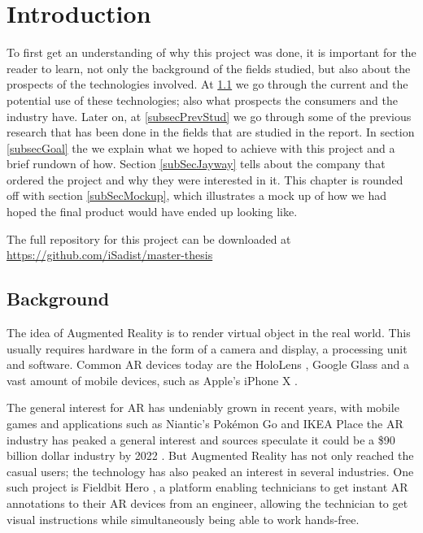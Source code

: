 \chapter{Introduction}
To first get an understanding of why this project was done, it is important for the reader to learn, not only the background of the fields studied, but also about the prospects of the technologies involved.
 At \ref{subsecBackground} we go through the current and the potential use of these technologies; also what prospects the consumers and the industry have. Later on, at  \ref{subsecPrevStud} we go through some of the previous research that has been done in the fields that are studied in the report. In section \ref{subsecGoal} the we explain what we hoped to achieve with this project and a brief rundown of how. Section \ref{subSecJayway} tells about the company that ordered the project and why they were interested in it. This chapter is rounded off with section \ref{subSecMockup}, which illustrates a mock up of how we had hoped the final product would have ended up looking like.
 
 The full repository for this project can be downloaded at \url{https://github.com/iSadist/master-thesis}

\section{Background}
\label{subsecBackground}
The idea of Augmented Reality is to render virtual object in the real world. This usually 
requires hardware in the form of a camera and display, a processing unit and software. 
Common AR devices today are the HoloLens \cite{microsoft}, Google Glass 
\cite{googleGlasses} and a vast amount of mobile devices, such as Apple's iPhone X 
\cite{appleAR}. 

The general interest for AR has undeniably grown in recent years, with mobile games and 
applications such as Niantic's Pokémon Go \cite{pokemonGO} and IKEA Place 
\cite{IKEAPlace} the AR industry has peaked a general interest and sources speculate it 
could be a \$90 billion dollar industry by 2022 \cite{digi-capital}.
But Augmented Reality has not only reached the casual users; the technology has also 
peaked an interest in several industries. One such project is Fieldbit Hero 
\cite{fieldbit}, a platform enabling technicians to get instant AR annotations to their AR 
devices from an engineer, allowing the technician to get visual instructions while 
simultaneously  being able to work hands-free. 
 
